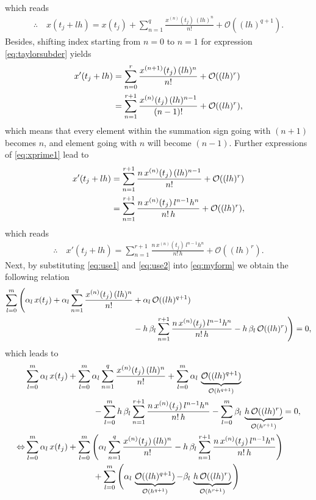 \documentclass[12pt]{article}
\begin{document}
which reads 
\begin{align}
	\label{eq:use1}
	\therefore\quad\boxed{
	x(t_j+lh) = x(t_j) + \sum_{n=1}^{q} \frac{x^{(n)}(t_j)\,(lh)^{n}}{n!} + \mathcal{O}((lh)^{q+1}).
	}
\end{align}
Besides, shifting index starting from $n=0$ to $n=1$ for expression \eqref{eq:taylorsubder} yields
\begin{align}
	\label{eq:xprime1}
	x'(t_j+lh) 
	 & = \sum_{n=0}^{r} \frac{x^{(n+1)}(t_j)\,(lh)^{n}}{n!} + \mathcal{O}((lh)^{r}) \notag \\
	 & = \sum_{n=1}^{r+1} \frac{x^{(n)}(t_j)\,(lh)^{n-1}}{(n-1)!} + \mathcal{O}((lh)^{r}),
\end{align}
which means that every element within the summation sign going with $(n+1)$ becomes $n$, and 
element going with $n$ will become $(n-1)$. Further expressions of 
\eqref{eq:xprime1} lead to
\begin{align}
	\label{eq:xprime2}
	x'(t_j+lh) 
	 & = \sum_{n=1}^{r+1} \frac{n\,x^{(n)}(t_j)\,(lh)^{n-1}}{n!} + \mathcal{O}((lh)^{r}) \notag \\
	 & = \sum_{n=1}^{r+1} \frac{n\,x^{(n)}(t_j)\,l^{n-1}h^{n}}{n!\,h} + \mathcal{O}((lh)^{r}),
\end{align}
which reads 
\begin{align}
	\label{eq:use2}
	\therefore\quad\boxed{
	x'(t_j+lh)  = \sum_{n=1}^{r+1} \frac{n\,x^{(n)}(t_j)\,l^{n-1}h^{n}}{n!\,h} + \mathcal{O}((lh)^{r}).
	}
\end{align}
Next, by substituting \eqref{eq:use1} and \eqref{eq:use2} into \eqref{eq:myform}
we obtain the following relation
\begin{align}
	\sum_{l=0}^{{m}}
	\Bigg( 
	\alpha_l\,x(t_j)
	+ \alpha_l\sum_{n=1}^{q} \frac{x^{(n)}(t_j)\,(lh)^{n}}{n!}
	 & + 
	\alpha_l\,\mathcal{O}((lh)^{q+1}) 
	\notag \\
	 & 
	- h\,\beta_l
	\sum_{n=1}^{r+1} \frac{n\,x^{(n)}(t_j)\,l^{n-1}h^{n}}{n!\,h} 
	- h\,\beta_l\, 
	\mathcal{O}((lh)^{r})
	\Bigg) 
	= 0,
\end{align}
which leads to 
\begin{align}
	 & \sum_{l=0}^{{m}}\alpha_l\,x(t_j)
	+ 
	\sum_{l=0}^{{m}}\alpha_l\sum_{n=1}^{q} \frac{x^{(n)}(t_j)\,(lh)^{n}}{n!}
	+ 
	\sum_{l=0}^{{m}}\alpha_l\,\underbrace{\mathcal{O}((lh)^{q+1})}_{\mathcal{O}(h^{q+1})}
	\notag                               \\ 
	 & \qquad\qquad\qquad\qquad 
	- \sum_{l=0}^{{m}} h\,\beta_l \sum_{n=1}^{r+1} \frac{n\,x^{(n)}(t_j)\,l^{n-1}h^{n}}{n!\,h} 
	- \sum_{l=0}^{{m}} \beta_l\,\underbrace{h\,\mathcal{O}((lh)^{r})}_{\mathcal{O}(h^{r+1})}
	= 0,
	\notag                               \\
	\Leftrightarrow
	 & \sum_{l=0}^{{m}}\alpha_l\,x(t_j) 
	+ \sum_{l=0}^{{m}}
	\Bigg(
	\alpha_l\sum_{n=1}^{q} \frac{x^{(n)}(t_j)\,(lh)^{n}}{n!}
	- h\,\beta_l \sum_{n=1}^{r+1} \frac{n\,x^{(n)}(t_j)\,l^{n-1}h^{n}}{n!\,h} 
	\Bigg) \notag                        \\
	 & \qquad\qquad\qquad\qquad 
	 + \sum_{l=0}^{{m}}
	 \Bigg(
		\alpha_l\,\underbrace{\mathcal{O}((lh)^{q+1})}_{\mathcal{O}(h^{q+1})}
		- 
		\beta_l\,\underbrace{h\,\mathcal{O}((lh)^{r})}_{\mathcal{O}(h^{r+1})}
	 \Bigg)
\end{align}
\end{document}
